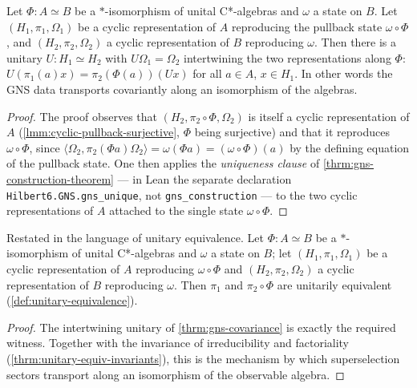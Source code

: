 \begin{theorem}
    \label{thrm:gns-covariance}
    \leanok
    Let $\Phi : A \simeq B$ be a $*$-isomorphism of unital C*-algebras and $\omega$ a state on $B$. Let $(H_1, \pi_1, \Omega_1)$ be a cyclic representation of $A$ reproducing the pullback state $\omega \circ \Phi$, and $(H_2, \pi_2, \Omega_2)$ a cyclic representation of $B$ reproducing $\omega$. Then there is a unitary $U : H_1 \simeq H_2$ with $U\Omega_1 = \Omega_2$ intertwining the two representations along $\Phi$: $U(\pi_1(a)x) = \pi_2(\Phi(a))(Ux)$ for all $a \in A$, $x \in H_1$. In other words the GNS data transports covariantly along an isomorphism of the algebras.
\end{theorem}
\begin{proof}
    \leanok
    The proof observes that $(H_2, \pi_2 \circ \Phi, \Omega_2)$ is itself a cyclic representation of $A$ (\ref{lmm:cyclic-pullback-surjective}, $\Phi$ being surjective) and that it reproduces $\omega \circ \Phi$, since $\langle \Omega_2, \pi_2(\Phi a)\Omega_2\rangle = \omega(\Phi a) = (\omega \circ \Phi)(a)$ by the defining equation of the pullback state. One then applies the \emph{uniqueness clause} of \ref{thrm:gns-construction-theorem} --- in Lean the separate declaration \texttt{Hilbert6.GNS.gns\_unique}, not \texttt{gns\_construction} --- to the two cyclic representations of $A$ attached to the single state $\omega \circ \Phi$.
\end{proof}

\begin{theorem}
    \label{thrm:gns-covariance-unitary-equiv}
    \leanok
    Restated in the language of unitary equivalence. Let $\Phi : A \simeq B$ be a $*$-isomorphism of unital C*-algebras and $\omega$ a state on $B$; let $(H_1, \pi_1, \Omega_1)$ be a cyclic representation of $A$ reproducing $\omega \circ \Phi$ and $(H_2, \pi_2, \Omega_2)$ a cyclic representation of $B$ reproducing $\omega$. Then $\pi_1$ and $\pi_2 \circ \Phi$ are unitarily equivalent (\ref{def:unitary-equivalence}).
\end{theorem}
\begin{proof}
    \leanok
    The intertwining unitary of \ref{thrm:gns-covariance} is exactly the required witness. Together with the invariance of irreducibility and factoriality (\ref{thrm:unitary-equiv-invariants}), this is the mechanism by which superselection sectors transport along an isomorphism of the observable algebra.
\end{proof}

